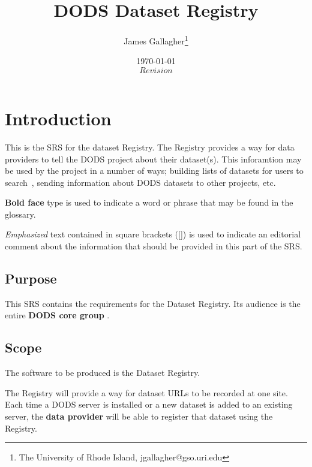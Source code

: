 \documentclass{article}
\begin{document}
\title{DODS Dataset Registry}
\author{James Gallagher\thanks{The University of Rhode Island,
    jgallagher@gso.uri.edu}}
\date{\today \\ $Revision$ }



\maketitle
\tableofcontents

\section{Introduction}

This is the \ac{SRS} for the dataset Registry. The Registry provides a way
for data providers to tell the DODS project about their dataset(s). This
inforamtion may be used by the project in a number of ways; building lists of
datasets for users to search~\cite{gallagher:list-srs}, sending information
about DODS datasets to other projects, etc.

\textbf{Bold face} type is used to indicate a word or phrase that may be
found in the glossary.

\emph{Emphasized} text contained in square brackets ([]) is used to indicate
an editorial comment about the information that should be provided in this
part of the \ac{SRS}.


\subsection{Purpose}
This \ac{SRS} contains the requirements for the Dataset Registry. Its
audience is the entire \textbf{DODS core group}
.

\subsection{Scope}
The software to be produced is the Dataset Registry.

The Registry will provide a way for dataset URLs to be recorded at one site.
Each time a DODS server is installed or a new dataset is added to an existing
server, the \textbf{data provider}  will be able
to register that dataset using the Registry.
\end{document}
